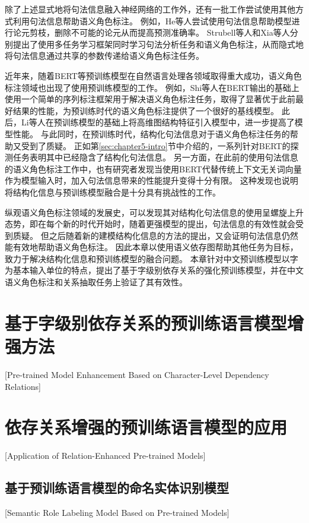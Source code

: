 除了上述显式地将句法信息融入神经网络的工作外，还有一批工作尝试使用其他方式利用句法信息帮助语义角色标注。
例如，He等人\cite{he-etal-2018-syntax,he-etal-2019-syntax}尝试使用句法信息帮助模型进行论元剪枝，删除不可能的论元从而提高预测准确率。
Strubell等人\cite{strubell-etal-2018-linguistically}和Xia等人\cite{xia-etal-2019-syntax}分别提出了使用多任务学习框架同时学习句法分析任务和语义角色标注，从而隐式地将句法信息通过共享的参数传递给语义角色标注任务。

近年来，随着BERT等预训练模型在自然语言处理各领域取得重大成功，语义角色标注领域也出现了使用预训练模型的工作。
例如，Shi等人\cite{shi-lin-2019-simple}在BERT输出的基础上使用一个简单的序列标注框架用于解决语义角色标注任务，取得了显著优于此前最好结果的性能，为预训练时代的语义角色标注提供了一个很好的基线模型。
此后，Li等人\cite{li-etal-2020-high}在预训练模型的基础上将高维图结构特征引入模型中，进一步提高了模型性能。
与此同时，在预训练时代，结构化句法信息对于语义角色标注任务的帮助又受到了质疑。
正如第\ref{sec:chapter5-intro}节中介绍的，一系列针对BERT的探测任务表明其中已经隐含了结构化句法信息。
另一方面，在此前的使用句法信息的语义角色标注工作中，也有研究者发现当使用BERT代替传统上下文无关词向量作为模型输入时，加入句法信息带来的性能提升变得十分有限\cite{xia-etal-2019-syntax}。
这种发现也说明将结构化信息与预训练模型融合是十分具有挑战性的工作。

纵观语义角色标注领域的发展史，可以发现其对结构化句法信息的使用呈螺旋上升态势，即在每个新的时代开始时，随着更强模型的提出，句法信息的有效性就会受到质疑。
但之后随着新的建模结构化信息的方法的提出，又会证明句法信息仍然能有效地帮助语义角色标注。
因此本章以使用语义依存图帮助其他任务为目标，致力于解决结构化信息和预训练模型的融合问题。
本章针对中文预训练模型以字为基本输入单位的特点，提出了基于字级别依存关系的强化预训练模型，并在中文语义角色标注和关系抽取任务上验证了其有效性。


\section{基于字级别依存关系的预训练语言模型增强方法}[Pre-trained Model Enhancement Based on Character-Level Dependency Relations]


\section{依存关系增强的预训练语言模型的应用}[Application of Relation-Enhanced Pre-trained Models]

\subsection{基于预训练语言模型的命名实体识别模型}[Semantic Role Labeling Model Based on Pre-trained Models]

